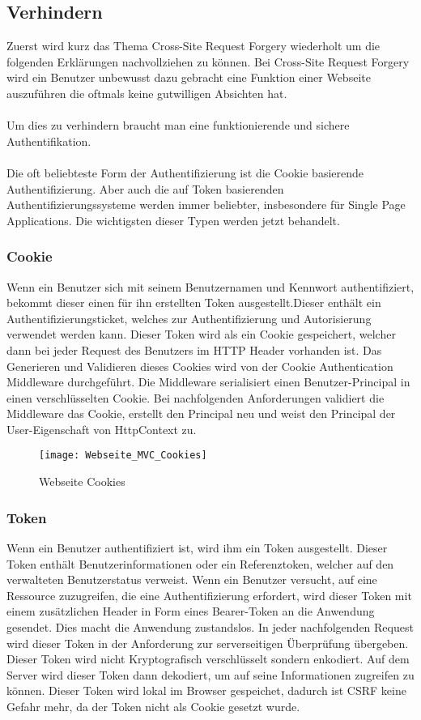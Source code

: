 {\subsection{Verhindern}
\label{sec:xsrf_prevent}
Zuerst wird kurz das Thema Cross-Site Request Forgery wiederholt um die folgenden Erklärungen nachvollziehen zu können. Bei Cross-Site Request Forgery wird ein Benutzer unbewusst dazu gebracht eine Funktion einer Webseite auszuführen die oftmals keine gutwilligen Absichten hat.\\ \\Um dies zu verhindern braucht man eine funktionierende und sichere Authentifikation. \\ \\Die oft beliebteste Form der Authentifizierung ist die Cookie basierende Authentifizierung. Aber auch die auf Token basierenden Authentifizierungssysteme werden immer beliebter, insbesondere für Single Page Applications. Die wichtigsten dieser Typen werden jetzt behandelt.
\subsubsection{Cookie}
Wenn ein Benutzer sich mit seinem Benutzernamen und Kennwort authentifiziert, bekommt dieser einen für ihn erstellten Token ausgestellt.Dieser enthält ein Authentifizierungsticket, welches zur Authentifizierung und Autorisierung verwendet werden kann. Dieser Token wird als ein Cookie gespeichert, welcher dann bei jeder Request des Benutzers im HTTP Header vorhanden ist. Das Generieren und Validieren dieses Cookies wird von der Cookie Authentication Middleware durchgeführt. Die Middleware serialisiert einen Benutzer-Principal in einen verschlüsselten Cookie. Bei nachfolgenden Anforderungen validiert die Middleware das Cookie, erstellt den Principal neu und weist den Principal der User-Eigenschaft von HttpContext zu.
\begin{figure}[H]
    \texttt{[image: Webseite\_MVC\_Cookies]}
    \caption{Webseite Cookies}
    \label{fig:webcookies}
\end{figure}
\subsubsection{Token}
Wenn ein Benutzer authentifiziert ist, wird ihm ein Token ausgestellt. Dieser Token enthält Benutzerinformationen oder ein Referenztoken, welcher auf den verwalteten Benutzerstatus verweist. Wenn ein Benutzer versucht, auf eine Ressource zuzugreifen, die eine Authentifizierung erfordert, wird dieser Token mit einem zusätzlichen Header in Form eines Bearer-Token an die Anwendung gesendet. Dies macht die Anwendung zustandslos. In jeder nachfolgenden Request wird dieser Token in der Anforderung zur serverseitigen Überprüfung übergeben. Dieser Token wird nicht Kryptografisch verschlüsselt sondern enkodiert. Auf dem Server wird dieser Token dann dekodiert, um auf seine Informationen zugreifen zu können. Dieser Token wird lokal im Browser gespeichet, dadurch ist CSRF keine Gefahr mehr, da der Token nicht als Cookie gesetzt wurde.
}
